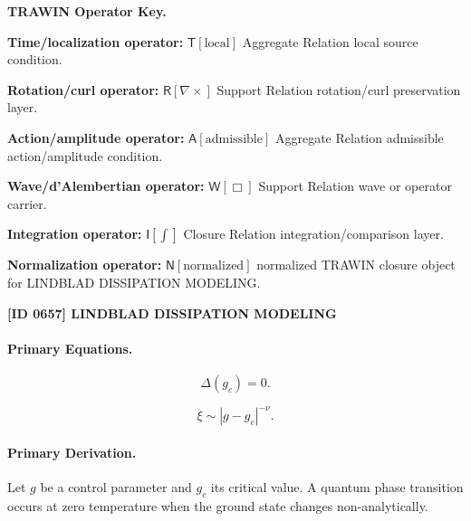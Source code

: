 \par\vspace{0.45\baselineskip}
\noindent\begin{minipage}[t]{\linewidth}
\begingroup
\small
\raggedright
\textbf{TRAWIN Operator Key.}\par
\noindent\textbf{Time/localization operator:} $\mathsf{T}\!\left[\mathrm{local}\right]$ Aggregate Relation local source condition.\par
\noindent\textbf{Rotation/curl operator:} $\mathsf{R}\!\left[\nabla\times\right]$ Support Relation rotation/curl preservation layer.\par
\noindent\textbf{Action/amplitude operator:} $\mathsf{A}\!\left[\mathrm{admissible}\right]$ Aggregate Relation admissible action/amplitude condition.\par
\noindent\textbf{Wave/d'Alembertian operator:} $\mathsf{W}\!\left[\Box\right]$ Support Relation wave or operator carrier.\par
\noindent\textbf{Integration operator:} $\mathsf{I}\!\left[\int\right]$ Closure Relation integration/comparison layer.\par
\noindent\textbf{Normalization operator:} $\mathsf{N}\!\left[\mathrm{normalized}\right]$ normalized TRAWIN closure object for LINDBLAD DISSIPATION MODELING.\par
\endgroup
\end{minipage}

\clearpage
\noindent\textbf{[ID 0657] LINDBLAD DISSIPATION MODELING}\par
\vspace{0.35em}
\paragraph{Primary Equations.}
\begin{equation}
\Delta(g_c)=0 .
\end{equation}

\begin{equation}
\xi \sim |g-g_c|^{-\nu}.
\end{equation}

\paragraph{Primary Derivation.}
Let $g$ be a control parameter and $g_c$ its critical value.  
A quantum phase transition occurs at zero temperature when the ground state changes non-analytically.

